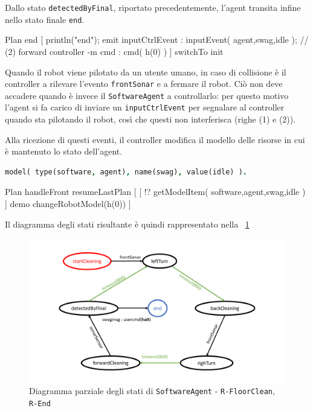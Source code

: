 \documentclass{../llncs}
\newcommand{\codescript}[1]{{\mbox{\small{\texttt{#1}}}}\xspace}
\newcommand{\code}[1]{{\color{blue}\small{\texttt{#1}}}}
\newcommand{\labelfig}[1]{\label{fig:#1}}
\newcommand{\xf}[1]{\figurename~\ref{fig:#1}}
\begin{document}
Dallo stato \codescript{detectedByFinal}, riportato precedentemente, l'agent transita infine nello stato finale \codescript{end}.\\

\begin{qacode}[caption={SoftwareAgent, pt5}]
Plan end [
	println("end");
	emit inputCtrlEvent : inputEvent( agent,swag,idle ); // (2)
	forward controller -m cmd : cmd( h(0) )
]
switchTo init
\end{qacode}

Quando il robot viene pilotato da un utente umano, in caso di collisione è il controller a rilevare l'evento \codescript{frontSonar} e a fermare il robot. Ciò non deve accadere quando è invece il \texttt{SoftwareAgent} a controllarlo: per questo motivo l'agent si fa carico di inviare un \codescript{inputCtrlEvent} per segnalare al controller quando sta pilotando il robot, così che questi non interferisca (righe (1) e (2)).

Alla ricezione di questi eventi, il controller modifica il modello delle risorse in cui è mantenuto lo stato dell'agent.\\

\begin{lstlisting}[language=Prolog, keywordstyle=\color{black}, caption={resourceModel.pl}]
% Modello dell'agent
model( type(software, agent), name(swag), value(idle) ).
\end{lstlisting}

\begin{qacode}[caption={Gestione di \codescript{frontSonar} da parte del \texttt{Controller}}]
Plan handleFront resumeLastPlan [
	[ !? getModelItem( software,agent,swag,idle ) ]
		demo changeRobotModel(h(0))
]
\end{qacode}

Il diagramma degli stati risultante è quindi rappresentato nella \xf{floorClean}

\begin{figure}[!htb]
\centering
\includegraphics[scale=0.4]{img/stateDiagramCleaning.png}
\caption{Diagramma parziale degli stati di \texttt{SoftwareAgent} - \code{R-FloorClean}, \code{R-End}}\labelfig{floorClean}
\end{figure}
\end{document}
